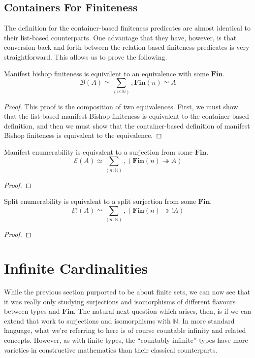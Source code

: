 \begin{refsection}
\subsection{Containers For Finiteness}
The definition for the container-based finiteness predicates are almost
identical to their list-based counterparts.
One advantage that they have, however, is that conversion back and forth between
the relation-based finiteness predicates is very straightforward.
This allows us to prove the following.
\begin{theorem}
  Manifest bishop finiteness is equivalent to an equivalence with some \(\mathbf{Fin}\).
  \begin{equation}
    \mathcal{B}(A) \simeq \sum_{(n : \mathbb{N})} , \mathbf{Fin}(n) \simeq A
  \end{equation}
\end{theorem}
\begin{proof}
  This proof is the composition of two equivalences.
  First, we must show that the list-based manifest Bishop finiteness is
  equivalent to the container-based definition, and then we must show that the
  container-based definition of manifest Bishop finiteness is equivalent to the
  equivalence.
\end{proof}

\begin{lemma}
  Manifest enumerability is equivalent to a surjection from some \(\mathbf{Fin}\).
  \begin{equation}
    \mathcal{E}(A) \simeq \sum_{(n : \mathbb{N})} , \left(  \mathbf{Fin}(n) \twoheadrightarrow A \right)
  \end{equation}
\end{lemma}
\begin{proof}
\end{proof}

\begin{lemma}
  Split enumerability is equivalent to a split surjection from some \(\mathbf{Fin}\).
  \begin{equation}
    \mathcal{E}!(A) \simeq \sum_{(n : \mathbb{N})} , \left(  \mathbf{Fin}(n) \twoheadrightarrow ! A \right)
  \end{equation}
\end{lemma}
\begin{proof}
\end{proof}

\section{Infinite Cardinalities} \label{infinite-cardinalities}
While the previous section purported to be about finite sets, we can now see
that it was really only studying surjections and isomorphisms of different
flavours between types and \(\mathbf{Fin}\).
The natural next question which arises, then, is if we can extend that work to
surjections and isomorphisms with \(\mathbb{N}\).
In more standard language, what we're referring to here is of course
countable infinity and related concepts.
However, as with finite types, the ``countably infinite'' types have more
varieties in constructive mathematics than their classical counterparts.

\end{refsection}
